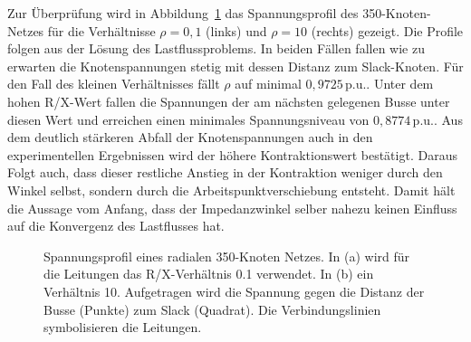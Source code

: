 Zur Überprüfung wird in Abbildung~\ref{fig:rx_voltage_profile_350} das Spannungsprofil des 350-Knoten-Netzes für die Verhältnisse $\rho=0,1$ (links) und $\rho=10$ (rechts) gezeigt. 
Die Profile folgen aus der Lösung des Lastflussproblems.
In beiden Fällen fallen wie zu erwarten die Knotenspannungen stetig mit dessen Distanz zum Slack-Knoten.
Für den Fall des kleinen Verhältnisses fällt $\rho$ auf  minimal $0,9725\,$p.u..
Unter dem hohen R/X-Wert fallen die Spannungen der am nächsten gelegenen Busse unter diesen Wert und erreichen einen minimales Spannungsniveau von $0,8774\,$p.u..
Aus dem deutlich stärkeren Abfall der Knotenspannungen auch in den experimentellen Ergebnissen wird der höhere Kontraktionswert bestätigt.
Daraus Folgt auch, dass dieser restliche Anstieg in der Kontraktion weniger durch den Winkel  selbst, sondern durch die Arbeitspunktverschiebung entsteht.
Damit hält die Aussage vom Anfang, dass der Impedanzwinkel selber nahezu keinen Einfluss auf die Konvergenz des Lastflusses hat.\\





\begin{figure}[htbp]
	\centering
	
	\caption{Spannungsprofil eines radialen 350-Knoten Netzes. In (a) wird für die Leitungen das R/X-Verhältnis 0.1 verwendet. In (b) ein Verhältnis 10. Aufgetragen wird die Spannung gegen die Distanz der Busse (Punkte) zum Slack (Quadrat). Die Verbindungslinien symbolisieren die Leitungen. }
	\label{fig:rx_voltage_profile_350}
\end{figure}









